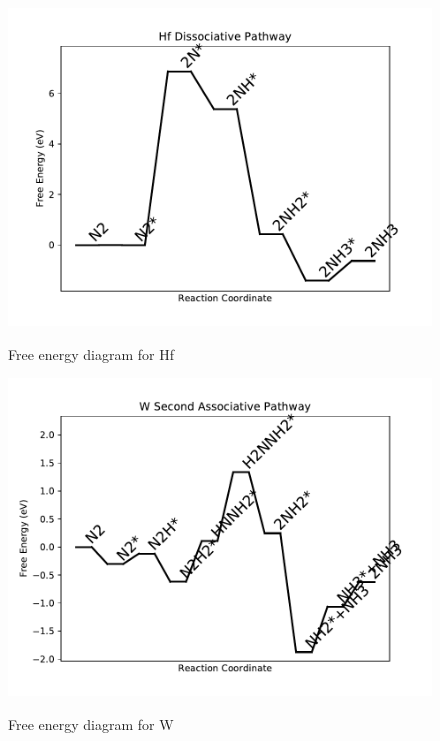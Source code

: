 \documentclass{article}
\begin{document}
\begin{figure}
\includegraphics[width=1\linewidth]{data/plots/Hf_dissociative.pdf}
\label{fig:Hf_dissociative}
\caption{Free energy diagram for Hf}
\end{figure}

\begin{figure}
\includegraphics[width=1\linewidth]{data/plots/W_associative_2.pdf}
\label{fig:W_associative_2}
\caption{Free energy diagram for W}
\end{figure}
\end{document}
